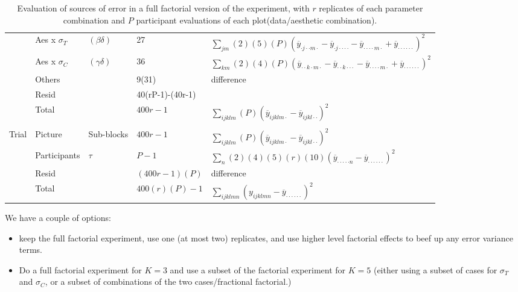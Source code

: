 \begin{table}[h]
\begin{tabular}{lllll}
      & Aes x $\sigma_T$ & $(\beta\delta)$ & 27 & 
      $\sum_{jm} (2)(5)(P)(\overline{y}_{\cdot j\cdot\cdot m\cdot}- 
                           \overline{y}_{\cdot j\cdot\cdot\cdot\cdot} - 
                           \overline{y}_{\cdot\cdot\cdot\cdot m\cdot} + 
                           \overline{y}_{\cdot\cdot\cdot\cdot\cdot\cdot})^2$ \\
      & Aes x $\sigma_C$ & $(\gamma\delta)$ & 36 & 
      $\sum_{km} (2)(4)(P)(\overline{y}_{\cdot\cdot k\cdot m\cdot}- 
                           \overline{y}_{\cdot\cdot k\cdot\cdot\cdot} - 
                           \overline{y}_{\cdot\cdot\cdot\cdot m\cdot} + 
                           \overline{y}_{\cdot\cdot\cdot\cdot\cdot\cdot})^2$ \\
      \cline{2-5}
      & Others & & 9(31) & \multirow{2}{*}{difference }\\
      & Resid & & 40(rP-1)-(40r-1)  & \\
      \cline{2-5}
      & Total & & $400r-1$ & 
      $\sum_{ijklm} (P)(\overline{y}_{ijklm\cdot}-
                        \overline{y}_{ijkl\cdot\cdot})^2$ \\
      \hline\\\hline
\multirow{4}{*}{Trial}
      & Picture & Sub-blocks & $400r-1$ & 
      $\sum_{ijklm} (P)(\overline{y}_{ijklm\cdot}-
                        \overline{y}_{ijkl\cdot\cdot})^2$ \\
      \cline{2-5}
      & Participants & $\tau$ & $P-1$ & 
      $\sum_{n} (2)(4)(5)(r)(10) (\overline{y}_{\cdot\cdot\cdot\cdot\cdot n} -
                            \overline{y}_{\cdot\cdot\cdot\cdot\cdot\cdot})^2$ \\
      \cline{2-5}
      & Resid & & $(400r-1)(P)$ & difference \\
      \cline{2-5}
      & Total & & $400(r)(P)-1$ & 
      $\sum_{ijklmn} (y_{ijklmn} - 
                      \overline{y}_{\cdot\cdot\cdot\cdot\cdot\cdot})^2$ \\
      \hline\hline
\end{tabular}
\caption{Evaluation of sources of error in a full factorial version of the experiment, with $r$ replicates of each parameter combination and $P$ participant evaluations of each plot(data/aesthetic combination).}
\end{table}

We have a couple of options:
\begin{itemize}
\item keep the full factorial experiment, use one (at most two) replicates, and use higher level factorial effects to beef up any error variance terms. 
\item Do a full factorial experiment for $K=3$ and use a subset of the factorial experiment for $K=5$ (either using a subset of cases for $\sigma_T$ and $\sigma_C$, or a subset of combinations of the two cases/fractional factorial.)
\end{itemize}

